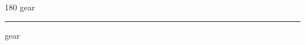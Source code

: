 
\begin{frame}
\begin{center}
\begin{turn}{180}
{\fontsize{2.5cm}{1em}\selectfont gear}
\end{turn}
\vspace{1em}\par  
\hrule
\vspace{1em}\par  
{\fontsize{2.5cm}{1em}\selectfont gear}
\end{center}
\end{frame}
